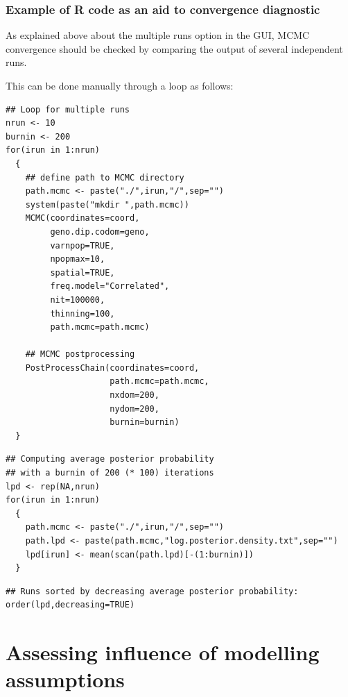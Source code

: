 \documentclass[a4paper,10pt]{article}
\begin{document}
\subsubsection{Example of R code as an aid to convergence diagnostic}
As explained above about the multiple runs option in the GUI, MCMC convergence should be checked by comparing the output of 
several independent runs. 

This can be done manually through a loop as follows:\\




\begin{verbatim}
## Loop for multiple runs
nrun <- 10
burnin <- 200
for(irun in 1:nrun)
  {
    ## define path to MCMC directory
    path.mcmc <- paste("./",irun,"/",sep="")   
    system(paste("mkdir ",path.mcmc))
    MCMC(coordinates=coord,
         geno.dip.codom=geno,
         varnpop=TRUE, 
         npopmax=10,
         spatial=TRUE,
         freq.model="Correlated",
         nit=100000,
         thinning=100,
         path.mcmc=path.mcmc)

    ## MCMC postprocessing
    PostProcessChain(coordinates=coord,
                     path.mcmc=path.mcmc,
                     nxdom=200,
                     nydom=200,
                     burnin=burnin)
  }
\end{verbatim}



\bigskip

\begin{verbatim}
## Computing average posterior probability
## with a burnin of 200 (* 100) iterations
lpd <- rep(NA,nrun)
for(irun in 1:nrun)
  {
    path.mcmc <- paste("./",irun,"/",sep="")
    path.lpd <- paste(path.mcmc,"log.posterior.density.txt",sep="")
    lpd[irun] <- mean(scan(path.lpd)[-(1:burnin)])
  }
\end{verbatim}



\bigskip

\begin{verbatim}
## Runs sorted by decreasing average posterior probability:
order(lpd,decreasing=TRUE)

\end{verbatim}




\clearpage
\section[Influence of model assumptions]{Assessing influence of modelling assumptions}
\end{document}
